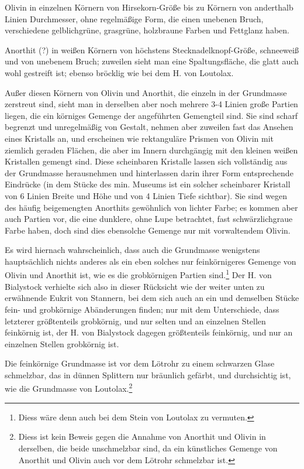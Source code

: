 \documentclass[a4paper, 11pt, oneside]{article}
\begin{document}
Olivin in einzelnen Körnern von Hirsekorn-Größe bis zu Körnern von anderthalb Linien Durchmesser, ohne regelmäßige Form, die einen unebenen Bruch, verschiedene gelblichgrüne, grasgrüne, holzbraune Farben und Fettglanz haben.

Anorthit (?) in weißen Körnern von höchstens Stecknadelknopf-Größe, schneeweiß und von unebenem Bruch; zuweilen sieht man eine Spaltungsfläche, die glatt auch wohl gestreift ist; ebenso bröcklig wie bei dem H. von Loutolax.

Außer diesen Körnern von Olivin und Anorthit, die einzeln in der Grundmasse zerstreut sind, sieht man in derselben aber noch mehrere 3-4 Linien große Partien liegen, die ein körniges Gemenge der angeführten Gemengteil sind. Sie sind scharf begrenzt und unregelmäßig von Gestalt, nehmen aber zuweilen fast das Ansehen eines Kristalls an, und erscheinen wie rektanguläre Prismen von Olivin mit ziemlich geraden Flächen, die aber im Innern durchgängig mit den kleinen weißen Kristallen gemengt sind. Diese scheinbaren Kristalle lassen sich vollständig aus der Grundmasse herausnehmen und hinterlassen darin ihrer Form entsprechende Eindrücke (in dem Stücke des min. Museums ist ein solcher scheinbarer Kristall von 6 Linien Breite und Höhe und von 4 Linien Tiefe sichtbar). Sie sind wegen des häufig beigemengten Anorthits gewöhnlich von lichter Farbe; es kommen aber auch Partien vor, die eine dunklere, ohne Lupe betrachtet, fast schwärzlichgraue Farbe haben, doch sind dies ebensolche Gemenge nur mit vorwaltendem Olivin.

Es wird hiernach wahrscheinlich, dass auch die Grundmasse wenigstens hauptsächlich nichts anderes als ein eben solches nur feinkörnigeres Gemenge von Olivin und Anorthit ist, wie es die grobkörnigen Partien sind.\footnote{Diess wäre denn auch bei dem Stein von Loutolax zu vermuten.} Der H. von Bialystock verhielte sich also in dieser Rücksicht wie der weiter unten zu erwähnende Eukrit von Stannern, bei dem sich auch an ein und demselben Stücke fein- und grobkörnige Abänderungen finden; nur mit dem Unterschiede, dass letzterer größtenteils grobkörnig, und nur selten und an einzelnen Stellen feinkörnig ist, der H. von Bialystock dagegen größtenteils feinkörnig, und nur an einzelnen Stellen grobkörnig ist.

Die feinkörnige Grundmasse ist vor dem Lötrohr zu einem schwarzen Glase schmelzbar, das in dünnen Splittern nur bräunlich gefärbt, und durchsichtig ist, wie die Grundmasse von Loutolax.\footnote{Diess ist kein Beweis gegen die Annahme von Anorthit und Olivin in derselben, die beide unschmelzbar sind, da ein künstliches Gemenge von Anorthit und Olivin auch vor dem Lötrohr schmelzbar ist.}
\end{document}
